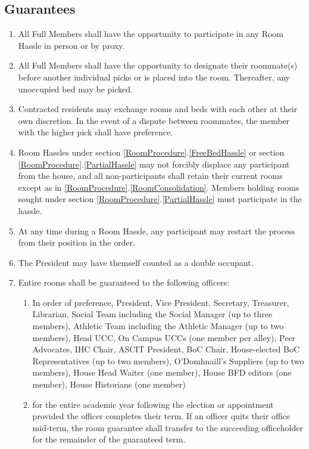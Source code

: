 \documentclass[10pt]{article} %
\begin{document}
\subsection{Guarantees}
\label{Guarantees}
\begin{enumerate}
\item All Full Members shall have the opportunity to participate in any Room Hassle in person or by proxy.
\item All Full Members shall have the opportunity to designate their roommate(s) before another individual picks or is placed into the room. Thereafter, any unoccupied bed may be picked.
\item Contracted residents may exchange rooms and beds with each other at their own discretion. In the event of a dispute between roommates, the member with the higher pick shall have preference.
\item Room Hassles under section \ref{RoomProcedure}.\ref{FreeBedHassle} or section \ref{RoomProcedure}.\ref{PartialHassle} may not forcibly displace any participant from the house, and all non-participants shall retain their current rooms except as in \ref{RoomProcedure}.\ref{RoomConsolidation}. Members holding rooms sought under section \ref{RoomProcedure}.\ref{PartialHassle} must participate in the hassle.
\item At any time during a Room Hassle, any participant may restart the process from their position in the order.
\item The President may have themself counted as a double occupant.
\item Entire rooms shall be guaranteed to the following officers:
\begin{enumerate}
\item In order of preference, President, Vice President, Secretary, Treasurer, Librarian, Social Team including the Social Manager (up to three members), Athletic Team including the Athletic Manager (up to two members), Head UCC, On Campus UCCs (one member per alley), Peer Advocates, IHC Chair, ASCIT President, BoC Chair, House-elected BoC Representatives (up to two members), O’Domhnaill’s Suppliers (up to two members), House Head Waiter (one member), House BFD editors (one member), House Historians (one member)
\item for the entire academic year following the election or appointment provided the officer completes their term. If an officer quits their office mid-term, the room guarantee shall transfer to the succeeding officeholder for the remainder of the guaranteed term.

\end{enumerate}
\end{enumerate}
\end{document}
